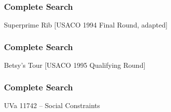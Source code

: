 \begin{frame}
\frametitle{Complete Search}
\begin{block}{Superprime Rib [USACO 1994 Final Round, adapted]}
%
%
\end{block}
\end{frame}

\begin{frame}
\frametitle{Complete Search}
\begin{block}{Betsy's Tour [USACO 1995 Qualifying Round]}
%
\end{block}
\end{frame}

\begin{frame}
\frametitle{Complete Search}
\begin{block}{UVa 11742 -- Social Constraints}
\end{block}
\end{frame}


